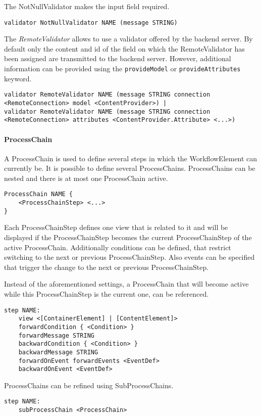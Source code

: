 The NotNullValidator makes the input field required.
\begin{lstlisting}
validator NotNullValidator NAME (message STRING)
\end{lstlisting}

The \textit{RemoteValidator} allows to use a validator offered by the backend server. By default only the content and id of the field on which the RemoteValidator has been assigned are transmitted to the backend server. However, additional information can be provided using the \lstinline!provideModel! or
\lstinline!provideAttributes! keyword.
\begin{lstlisting}
validator RemoteValidator NAME (message STRING connection <RemoteConnection> model <ContentProvider>) |
validator RemoteValidator NAME (message STRING connection <RemoteConnection> attributes <ContentProvider.Attribute> <...>)
\end{lstlisting}

\paragraph{ProcessChain}
\label{sec:processChain}
A ProcessChain is used to define several steps in which the WorkflowElement can currently be. It is possible to define several ProcessChains. ProcessChains can be nested and there is at most one ProcessChain active.
\begin{lstlisting}
ProcessChain NAME {
	<ProcessChainStep> <...>
}
\end{lstlisting}

 Each ProcessChainStep defines one view that is related to it and will be displayed if the ProcessChainStep becomes the current ProcessChainStep of the active ProcessChain. Additionally conditions can be defined, that restrict switching to the next or previous ProcessChainStep. Also events can be specified that trigger the change to the next or previous ProcessChainStep.
 
Instead of the aforementioned settings, a ProcessChain that will become active while this ProcessChainStep is the current one, can be referenced.
\begin{lstlisting}
step NAME:
	view <[ContainerElement] | [ContentElement]>
	forwardCondition { <Condition> }
	forwardMessage STRING
	backwardCondition { <Condition> }
	backwardMessage STRING
	forwardOnEvent forwardEvents <EventDef>
	backwardOnEvent <EventDef>
\end{lstlisting}

ProcessChains can be refined using SubProcessChains.
\begin{lstlisting}
step NAME:
	subProcessChain <ProcessChain>
\end{lstlisting}

